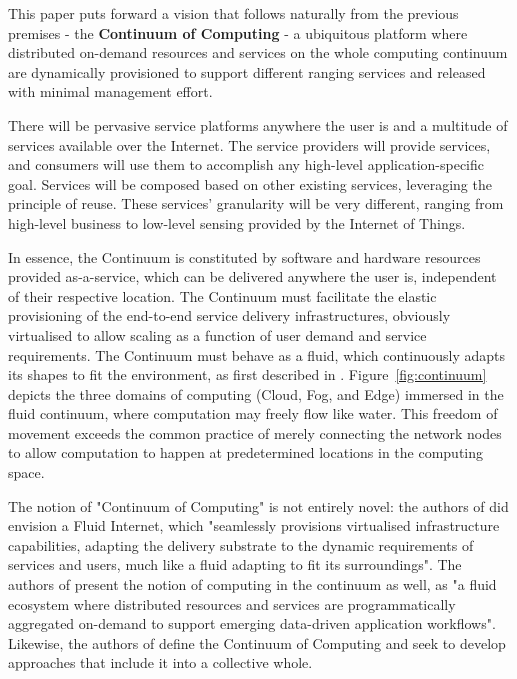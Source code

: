 This paper puts forward a vision that follows naturally from the previous premises - the \textbf{Continuum of Computing} - a ubiquitous platform where distributed on-demand resources and services on the whole computing continuum are dynamically provisioned to support different ranging services and released with minimal management effort.

There will be pervasive service platforms anywhere the user is and a multitude of services available over the Internet. The service providers will provide services, and consumers will use them to accomplish any high-level application-specific goal. Services will be composed based on other existing services, leveraging the principle of reuse. These services' granularity will be very different, ranging from high-level business to low-level sensing provided by the Internet of Things.

In essence, the Continuum is constituted by software and hardware resources provided as-a-service, which can be delivered anywhere the user is, independent of their respective location. 
The Continuum must facilitate the elastic provisioning of the end-to-end service delivery infrastructures, obviously virtualised to allow scaling as a function of user demand and service requirements. 
The Continuum must behave as a fluid, which continuously adapts its shapes to fit the environment, as first described in \cite{latre2014fluid}. Figure~\ref{fig:continuum} depicts the three domains of computing (Cloud, Fog, and Edge) immersed in the fluid continuum, where computation may freely flow like water. 
This freedom of movement exceeds the common practice of merely connecting the network nodes to allow computation to happen at predetermined locations in the computing space.

The notion of "Continuum of Computing" is not entirely novel: the authors of \cite{latre2014fluid} did envision a Fluid Internet, which "seamlessly provisions virtualised infrastructure capabilities, adapting the delivery substrate to the dynamic requirements of services and users, much like a fluid adapting to fit its surroundings". 
The authors of \cite{abdelbaky2017computing} present the notion of computing in the continuum as well, as "a fluid ecosystem where distributed resources and services are programmatically aggregated on-demand to support emerging data-driven application workflows". 
Likewise, the authors of \cite{beckman2020harnessing} define the Continuum of Computing and seek to develop approaches that include it into a collective whole.


